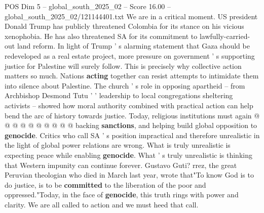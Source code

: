 \begin{textsample}{POS Dim 5 – global\_south\_2025\_02 – Score 16.00 – global\_south\_2025\_02/121144401.txt}
We are in a critical moment.
US president Donald Trump has publicly threatened Colombia for its stance on his vicious xenophobia.
He has also threatened SA for its commitment to lawfully-carried-out land reform.
In light of Trump ' s alarming statement that Gaza should be redeveloped as a real estate project, more pressure on government ' s supporting justice for Palestine will surely follow.
This is precisely why collective action matters so much.
Nations \textbf{acting} together can resist attempts to intimidate them into silence about Palestine.
The church ' s role in opposing apartheid -- from Archbishop Desmond Tutu ' ' leadership to local congregations sheltering activists -- showed how moral authority combined with practical action can help bend the arc of history towards justice.
Today, religious institutions must again @ @ @ @ @ @ @ @ @ @ backing \textbf{sanctions}, and helping build global opposition to \textbf{genocide}.
Critics who call SA ' s position impractical and therefore unrealistic in the light of global power relations are wrong.
What is truly unrealistic is expecting peace while enabling \textbf{genocide}.
What ' s truly unrealistic is thinking that Western impunity can continue forever.
Gustavo Guti? rrez, the great Peruvian theologian who died in March last year, wrote that"To know God is to do justice, is to be \textbf{committed} to the liberation of the poor and oppressed."Today, in the face of \textbf{genocide}, this truth rings with power and clarity.
We are all called to action and we must heed that call.

\end{textsample}
